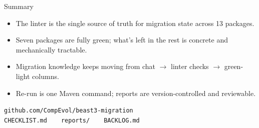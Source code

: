 \documentclass[aspectratio=169]{beamer}
\begin{document}
\begin{frame}{Summary}
  \begin{itemize}
    \item The linter is \alert{the single source of truth} for migration state across 13 packages.
    \item Seven packages are fully green; what's left in the rest is concrete and mechanically tractable.
    \item Migration knowledge keeps moving from chat $\rightarrow$ linter checks $\rightarrow$ green-light columns.
    \item Re-run is one Maven command; reports are version-controlled and reviewable.
  \end{itemize}
  \vspace{0.6em}
  \centering
  \texttt{github.com/CompEvol/beast3-migration} \\
  \texttt{CHECKLIST.md} ~ ~ \texttt{reports/} ~ ~ \texttt{BACKLOG.md}
\end{frame}
\end{document}
